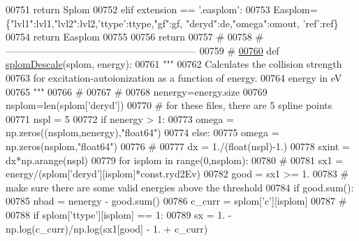 \begin{DoxyCode}
{{{{{{{{{{{00751         \textcolor{keywordflow}{return} Splom
00752     \textcolor{keywordflow}{elif}  extension == \textcolor{stringliteral}{'.easplom'}:
00753         Easplom=\{\textcolor{stringliteral}{"lvl1"}:lvl1,\textcolor{stringliteral}{"lvl2"}:lvl2,\textcolor{stringliteral}{'ttype'}:ttype,\textcolor{stringliteral}{"gf"}:gf, \textcolor{stringliteral}{"deryd"}:de,\textcolor{stringliteral}{"omega"}:omout, \textcolor{stringliteral}{'ref'}:ref\}
00754         \textcolor{keywordflow}{return} Easplom
00755 
00756     \textcolor{keywordflow}{return}
00757     \textcolor{comment}{#}
00758     \textcolor{comment}{#-----------------------------------------------------------}
00759     \textcolor{comment}{#}
\hypertarget{__chianti__tools_8py_source_l00760}{}\hyperlink{namespacepyneb_1_1utils_1_1__chianti__tools_a391eb09a09769234e5759d5544d0bcaf}{00760} \textcolor{keyword}{def }\hyperlink{namespacepyneb_1_1utils_1_1__chianti__tools_a391eb09a09769234e5759d5544d0bcaf}{splomDescale}(splom, energy):
00761     \textcolor{stringliteral}{"""}
00762 \textcolor{stringliteral}{    Calculates the collision strength}
00763 \textcolor{stringliteral}{    for excitation-autoionization as a function of energy.}
00764 \textcolor{stringliteral}{    energy in eV}
00765 \textcolor{stringliteral}{    """}
00766     \textcolor{comment}{#}
00767     \textcolor{comment}{#}
00768     nenergy=energy.size
00769     nsplom=len(splom[\textcolor{stringliteral}{'deryd'}])
00770     \textcolor{comment}{# for these files, there are 5 spline points}
00771     nspl = 5
00772     \textcolor{keywordflow}{if} nenergy > 1:
00773         omega = np.zeros((nsplom,nenergy),\textcolor{stringliteral}{"float64"})
00774     \textcolor{keywordflow}{else}:
00775         omega = np.zeros(nsplom,\textcolor{stringliteral}{"float64"})
00776     \textcolor{comment}{#}
00777     dx = 1./(float(nspl)-1.)
00778     sxint = dx*np.arange(nspl)
00779     \textcolor{keywordflow}{for} isplom \textcolor{keywordflow}{in} range(0,nsplom):
00780         \textcolor{comment}{#}
00781         sx1 = energy/(splom[\textcolor{stringliteral}{'deryd'}][isplom]*const.ryd2Ev)
00782         good = sx1 >= 1.
00783         \textcolor{comment}{# make sure there are some valid energies above the threshold}
00784         \textcolor{keywordflow}{if} good.sum():
00785             nbad = nenergy - good.sum()
00786             c\_curr = splom[\textcolor{stringliteral}{'c'}][isplom]
00787             \textcolor{comment}{#}
00788             \textcolor{keywordflow}{if} splom[\textcolor{stringliteral}{'ttype'}][isplom] == 1:
00789                 sx = 1. - np.log(c\_curr)/np.log(sx1[good] - 1. + c\_curr)
}}}}}}}}}}}
\end{DoxyCode}
